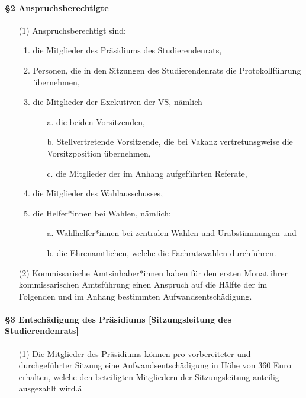     \paragraph{§2 Anspruchsberechtigte}
        \begin{itemize}
            \item[(1)] Anspruchsberechtigt sind:
                \begin{enumerate}
                    \item   die Mitglieder des Präsidiums des Studierendenrats, 
                    \item  Personen, die in den Sitzungen des Studierendenrats die Protokollführung übernehmen,  
                    \item  die Mitglieder der Exekutiven der VS, nämlich 
                        \begin{itemize}
                            \item[a.] die beiden Vorsitzenden, 
                            \item[b.] Stellvertretende Vorsitzende, die bei Vakanz vertretunsgweise die Vorsitzposition übernehmen,
                            \item[c.] die Mitglieder der im Anhang aufgeführten Referate, 
                        \end{itemize}
                    \item  die Mitglieder des Wahlausschusses, 
                    \item   die Helfer*innen bei Wahlen, nämlich:
                        \begin{itemize}
                            \item[a.] Wahlhelfer*innen bei zentralen Wahlen und Urabstimmungen und
                            \item[b.] die Ehrenamtlichen, welche die Fachratswahlen durchführen.
                        \end{itemize}
                \end{enumerate} 
            \item[(2)]  Kommissarische Amtsinhaber*innen haben für den ersten Monat ihrer kommissarischen Amtsführung einen Anspruch auf die Hälfte der im Folgenden und im Anhang bestimmten Aufwandsentschädigung.
        \end{itemize}
    \paragraph{§3 Entschädigung des Präsidiums  [Sitzungsleitung des Studierendenrats]}
        \begin{itemize}
            \item[(1)]  Die Mitglieder des Präsidiums können pro vorbereiteter und durchgeführter Sitzung eine Aufwandsentschädigung in Höhe von 360 Euro erhalten, welche den beteiligten Mitgliedern der Sitzungsleitung anteilig ausgezahlt wird.ä 
        \end{itemize}
